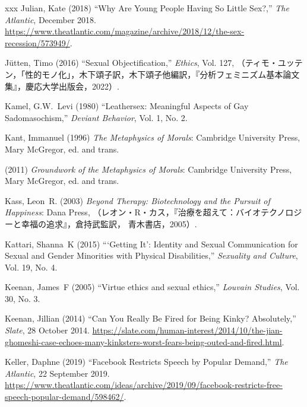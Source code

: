 \documentclass[]{jlreq} \usepackage{mystyle}
\begin{document}
\begin{thebibliography}{xxx}
Julian, Kate (2018) ``Why Are Young People Having So Little Sex?,'' \emph{The
  Atlantic}, December 2018.
  \url{https://www.theatlantic.com/magazine/archive/2018/12/the-sex-recession/573949/}.

Jütten, Timo (2016) ``Sexual Objectification,'' \textit{ Ethics}, Vol. 127,
  （ティモ・ユッテン，「性的モノ化」，木下頌子訳，木下頌子他編訳，『分析フェミニズム基本論文集』，慶応大学出版会，2022）.

Kamel, G.W.~Levi (1980) ``Leathersex: Meaningful Aspects of Gay
  Sadomasochism,'' \textit{ Deviant Behavior}, Vol. 1, No. 2.

Kant, Immanuel (1996)  \textit{ The Metaphysics of Morals}: Cambridge
  University Press, Mary McGregor, ed. and trans.

 \bysame{}  (2011)  \textit{ Groundwork of the Metaphysics of Morals}:
  Cambridge University Press, Mary McGregor, ed. and trans.

Kass, Leon~R. (2003)  \textit{ Beyond Therapy: Biotechnology and the Pursuit of
  Happiness}: Dana Press,
  （レオン・R・カス，『治療を超えて：バイオテクノロジーと幸福の追求』，倉持武監訳， 青木書店，2005）.

Kattari, Shanna~K (2015) ```Getting It': Identity and Sexual Communication for
  Sexual and Gender Minorities with Physical Disabilities,'' \textit{ Sexuality
  and Culture}, Vol. 19, No. 4.

Keenan, James~F (2005) ``Virtue ethics and sexual ethics,'' \textit{ Louvain
  Studies}, Vol. 30, No. 3.

Keenan, Jillian (2014) ``Can You Really Be Fired for Being Kinky? Absolutely,''
  \emph{Slate}, 28 October 2014.
  \url{https://slate.com/human-interest/2014/10/the-jian-ghomeshi-case-echoes-many-kinksters-worst-fears-being-outed-and-fired.html}.

Keller, Daphne (2019) ``Facebook Restricts Speech by Popular Demand,''
  \emph{The Atlantic}, 22 September 2019.
  \url{https://www.theatlantic.com/ideas/archive/2019/09/facebook-restricts-free-speech-popular-demand/598462/}.


\end{thebibliography}
\end{document}
